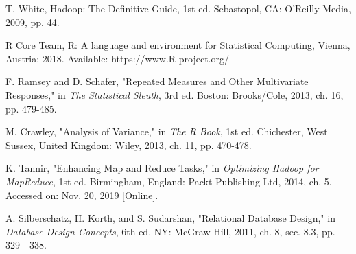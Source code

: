 \documentclass[journal]{IEEEtran}
\begin{document}
\begin{thebibliography}{1}
T. White, Hadoop: The Definitive Guide, 1st ed. Sebastopol,
 CA: O'Reilly Media, 2009, pp. 44.

R Core Team, R: A language and environment for Statistical Computing, Vienna, Austria: 2018.
 Available: https://www.R-project.org/
 
F. Ramsey and D. Schafer, "Repeated Measures and Other Multivariate Responses," 
 in \textit{The Statistical Sleuth}, 3rd ed. Boston: Brooks/Cole, 2013,
 ch. 16, pp. 479-485.  

M. Crawley, "Analysis of Variance," in \textit{The R Book},
 1st ed. Chichester, West Sussex, United Kingdom: Wiley, 2013,
 ch. 11, pp. 470-478.

K. Tannir, "Enhancing Map and Reduce Tasks," in 
 \textit{Optimizing Hadoop for MapReduce},
 1st ed. Birmingham, England: Packt Publishing Ltd, 2014,
 ch. 5. Accessed on: Nov. 20, 2019 [Online]. 
 
A. Silberschatz, H. Korth, and S. Sudarshan, "Relational Database Design," in
 \textit{Database Design Concepts}, 6th ed. NY: McGraw-Hill, 2011, ch. 8, sec. 8.3,
 pp. 329 - 338. 

\end{thebibliography}



\end{document}
